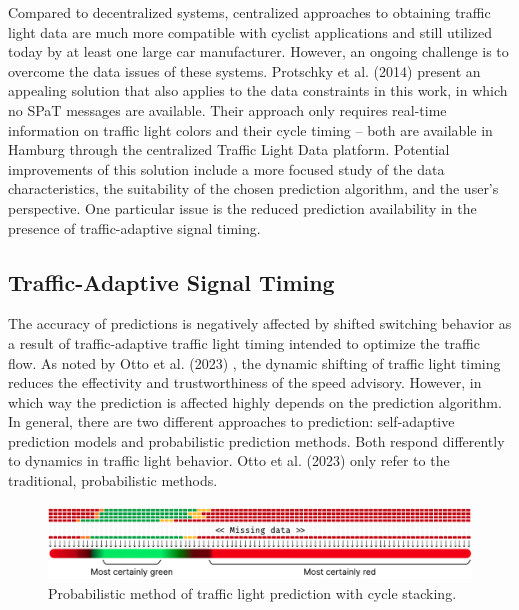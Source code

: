 Compared to decentralized systems, centralized approaches to obtaining traffic light data are much more compatible with cyclist applications and still utilized today by at least one large car manufacturer. However, an ongoing challenge is to overcome the data issues of these systems. Protschky et al. (2014) \cite{protschky_extensive_2014, protschky_adaptive_2014} present an appealing solution that also applies to the data constraints in this work, in which no SPaT messages are available. Their approach only requires real-time information on traffic light colors and their cycle timing -- both are available in Hamburg through the centralized Traffic Light Data platform. Potential improvements of this solution include a more focused study of the data characteristics, the suitability of the chosen prediction algorithm, and the user's perspective. One particular issue is the reduced prediction availability in the presence of traffic-adaptive signal timing.

\subsection{Traffic-Adaptive Signal Timing}

The accuracy of predictions is negatively affected by shifted switching behavior as a result of traffic-adaptive traffic light timing intended to optimize the traffic flow. As noted by Otto et al. (2023) \cite{otto_framework_2023}, the dynamic shifting of traffic light timing reduces the effectivity and trustworthiness of the speed advisory. However, in which way the prediction is affected highly depends on the prediction algorithm. In general, there are two different approaches to prediction: self-adaptive prediction models and probabilistic prediction methods. Both respond differently to dynamics in traffic light behavior. Otto et al. (2023) \cite{otto_framework_2023} only refer to the traditional, probabilistic methods.

\begin{figure}[t]
\centering
\includegraphics[width=\linewidth]{images/prediction.pdf}
\caption{Probabilistic method of traffic light prediction with cycle stacking.}
\label{fig:prediction}
\end{figure}

